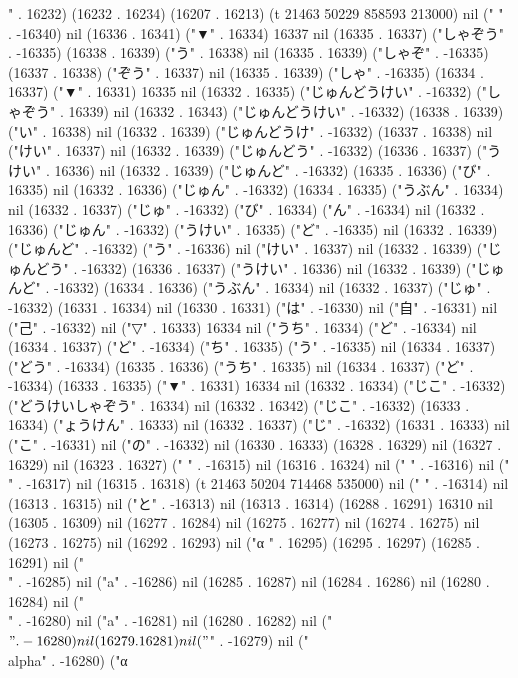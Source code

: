 " . 16232) (16232 . 16234) (16207 . 16213) (t 21463 50229 858593 213000) nil (" " . -16340) nil (16336 . 16341) ("▼" . 16334) 16337 nil (16335 . 16337) ("しゃぞう" . -16335) (16338 . 16339) ("う" . 16338) nil (16335 . 16339) ("しゃぞ" . -16335) (16337 . 16338) ("ぞう" . 16337) nil (16335 . 16339) ("しゃ" . -16335) (16334 . 16337) ("▼" . 16331) 16335 nil (16332 . 16335) ("じゅんどうけい" . -16332) ("しゃぞう" . 16339) nil (16332 . 16343) ("じゅんどうけい" . -16332) (16338 . 16339) ("い" . 16338) nil (16332 . 16339) ("じゅんどうけ" . -16332) (16337 . 16338) nil ("けい" . 16337) nil (16332 . 16339) ("じゅんどう" . -16332) (16336 . 16337) ("うけい" . 16336) nil (16332 . 16339) ("じゅんど" . -16332) (16335 . 16336) ("び" . 16335) nil (16332 . 16336) ("じゅん" . -16332) (16334 . 16335) ("うぶん" . 16334) nil (16332 . 16337) ("じゅ" . -16332) ("び" . 16334) ("ん" . -16334) nil (16332 . 16336) ("じゅん" . -16332) ("うけい" . 16335) ("ど" . -16335) nil (16332 . 16339) ("じゅんど" . -16332) ("う" . -16336) nil ("けい" . 16337) nil (16332 . 16339) ("じゅんどう" . -16332) (16336 . 16337) ("うけい" . 16336) nil (16332 . 16339) ("じゅんど" . -16332) (16334 . 16336) ("うぶん" . 16334) nil (16332 . 16337) ("じゅ" . -16332) (16331 . 16334) nil (16330 . 16331) ("は" . -16330) nil ("自" . -16331) nil ("己" . -16332) nil ("▽" . 16333) 16334 nil ("うち" . 16334) ("ど" . -16334) nil (16334 . 16337) ("ど" . -16334) ("ち" . 16335) ("う" . -16335) nil (16334 . 16337) ("どう" . -16334) (16335 . 16336) ("うち" . 16335) nil (16334 . 16337) ("ど" . -16334) (16333 . 16335) ("▼" . 16331) 16334 nil (16332 . 16334) ("じこ" . -16332) ("どうけいしゃぞう" . 16334) nil (16332 . 16342) ("じこ" . -16332) (16333 . 16334) ("ょうけん" . 16333) nil (16332 . 16337) ("じ" . -16332) (16331 . 16333) nil ("こ" . -16331) nil ("の" . -16332) nil (16330 . 16333) (16328 . 16329) nil (16327 . 16329) nil (16323 . 16327) ("
" . -16315) nil (16316 . 16324) nil (" " . -16316) nil (" " . -16317) nil (16315 . 16318) (t 21463 50204 714468 535000) nil (" " . -16314) nil (16313 . 16315) nil ("と" . -16313) nil (16313 . 16314) (16288 . 16291) 16310 nil (16305 . 16309) nil (16277 . 16284) nil (16275 . 16277) nil (16274 . 16275) nil (16273 . 16275) nil (16292 . 16293) nil ("α
" . 16295) (16295 . 16297) (16285 . 16291) nil ("\\" . -16285) nil ("a" . -16286) nil (16285 . 16287) nil (16284 . 16286) nil (16280 . 16284) nil ("\\" . -16280) nil ("a" . -16281) nil (16280 . 16282) nil ("$" . -16280) nil (16279 . 16281) nil ("$" . -16279) nil ("\\alpha" . -16280) ("α
